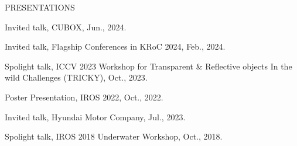 \begin{rSection}{PRESENTATIONS}{}{}{}        
    \begin{rSubsection}{}{}{}{}    
        \item Invited talk, CUBOX, Jun., 2024.
        \item Invited talk, Flagship Conferences in KRoC 2024, Feb., 2024.
        \item Spolight talk, ICCV 2023 Workshop for Transparent \& Reflective objects In the wild Challenges (TRICKY), Oct., 2023.
        \item Poster Presentation, IROS 2022, Oct., 2022.
        \item Invited talk, Hyundai Motor Company, Jul., 2023.
        \item Spolight talk, IROS 2018 Underwater Workshop, Oct., 2018.
     \end{rSubsection}         
 \end{rSection}

